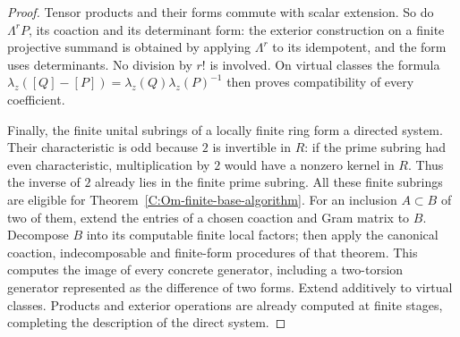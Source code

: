 \begin{proof}
Tensor products and their forms commute with scalar extension.
So do $\Lambda^rP$, its coaction and its determinant form: the
exterior construction on a finite projective summand is obtained
by applying $\Lambda^r$ to its idempotent, and the form uses
determinants. No division by $r!$ is involved. On virtual classes
the formula
$\lambda_z([Q]-[P])=\lambda_z(Q)\lambda_z(P)^{-1}$
then proves compatibility of every coefficient.

Finally, the finite unital subrings of a locally finite ring form
a directed system. Their characteristic is odd because $2$ is
invertible in $R$: if the prime subring had even characteristic,
multiplication by $2$ would have a nonzero kernel in $R$.
Thus the inverse of $2$ already lies in the finite prime subring.
All these finite subrings are eligible for
Theorem~\ref{C:Om-finite-base-algorithm}.
For an inclusion $A\subset B$ of two of them, extend the entries
of a chosen coaction and Gram matrix to $B$. Decompose $B$ into
its computable finite local factors; then apply the canonical
coaction, indecomposable and finite-form procedures of that theorem.
This computes the image of every concrete generator, including a
two-torsion generator represented as the difference of two forms.
Extend additively to virtual classes. Products and exterior
operations are already computed at finite stages, completing the
description of the direct system.
\end{proof}

